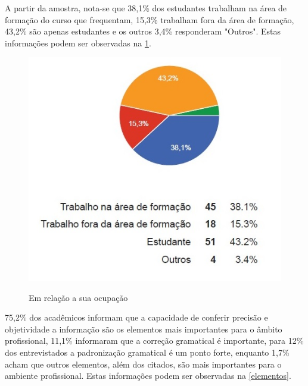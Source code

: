 \documentclass[
	article,			%
	11pt,				%
	oneside,			%
	a4paper,			%
	english,			%
	brazil,				%
	sumario=tradicional
	]{abntex2}
\begin{document}
A partir da amostra, nota-se que 38,1\% dos estudantes trabalham na área de formação do curso que frequentam, 15,3\% trabalham fora da área de formação, 43,2\% são apenas estudantes e os outros 3,4\% responderam "Outros". Estas informações podem ser observadas na \figurename{ \ref{ocupacao}}.

\begin{figure}[h]  
	\begin{center} 
		\begin{center}
			\changecaptionwidth 
			\captionwidth{13.5cm} %
			\caption{\label{ocupacao} Em relação a sua ocupação}
			{\includegraphics[scale=0.8]{imagens/ocupacao}}
		\end{center}
	\end{center}
\end{figure}
\FloatBarrier


75,2\% dos acadêmicos informam que a capacidade de conferir precisão e objetividade a informação são os elementos mais importantes para o âmbito profissional, 11,1\% informaram que a correção gramatical é importante, para 12\% dos entrevistados a padronização gramatical é um ponto forte, enquanto 1,7\% acham que outros elementos, além dos citados, são mais importantes para o ambiente profissional. Estas informações podem ser observadas na \figurename{ \ref{elementos}}.
\end{document}
